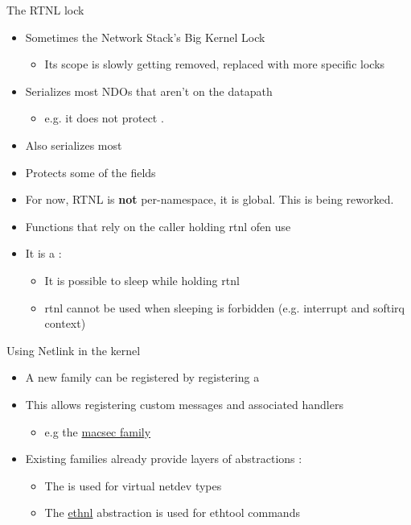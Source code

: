 \begin{frame}{The RTNL lock}
	\begin{itemize}
		\item Sometimes the Network Stack's Big Kernel Lock
			\begin{itemize}
				\item Its scope is slowly getting removed, replaced with more specific locks
			\end{itemize}
		\item Serializes most NDOs that aren't on the datapath
			\begin{itemize}
				\item e.g. it does not protect .
			\end{itemize}
		\item Also serializes most 
		\item Protects some of the  fields
		\item For now, RTNL is \textbf{not} per-namespace, it is global. This is being reworked.
		\item Functions that rely on the caller holding rtnl ofen use 
		\item It is a  :
			\begin{itemize}
				\item It is possible to sleep while holding rtnl
				\item rtnl cannot be used when sleeping is forbidden (e.g. interrupt and softirq context)
			\end{itemize}
	\end{itemize}
\end{frame}

\begin{frame}{Using Netlink in the kernel}
	\begin{itemize}
		\item A new family can be registered by registering a 
		\item This allows registering custom messages and associated handlers
			\begin{itemize}
				\item e.g the \href{https://elixir.bootlin.com/linux/v6.15.2/source/drivers/net/macsec.c\#L3360}{macsec family}
			\end{itemize}
		\item Existing families already provide layers of abstractions :
			\begin{itemize}
				\item The  is used for virtual netdev types
				\item The \href{https://elixir.bootlin.com/linux/v6.15.2/source/net/ethtool}{ethnl} abstraction is used for ethtool commands
			\end{itemize}
	\end{itemize}
\end{frame}

